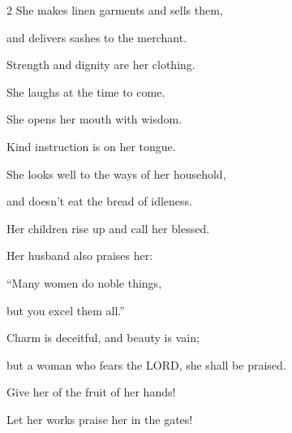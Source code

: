 \begin{multicols}{2}
\myverse{}She makes linen garments and sells them,

and delivers sashes to the merchant.


\myverse{}Strength and dignity are her clothing.

She laughs at the time to come.


\myverse{}She opens her mouth with wisdom.

Kind instruction is on her tongue.


\myverse{}She looks well to the ways of her household,

and doesn’t eat the bread of idleness.


\myverse{}Her children rise up and call her blessed.

Her husband also praises her:


\myverse{}“Many women do noble things,

but you excel them all.”


\myverse{}Charm is deceitful, and beauty is vain;

but a woman who fears the LORD, she shall be praised.


\myverse{}Give her of the fruit of her hands!

Let her works praise her in the gates!


\end{multicols}
